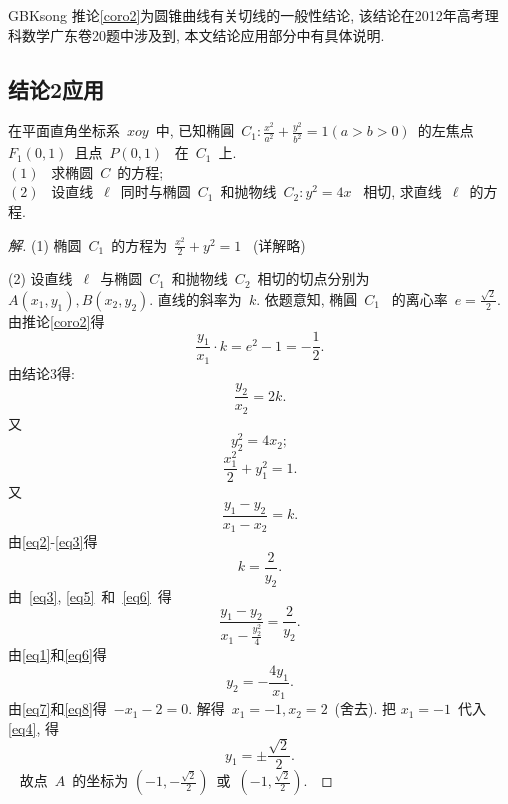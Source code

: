 \documentclass[a4paper, 12pt, twoside]{ctexart}
\begin{document}
\begin{CJK*}{GBK}{song}
    推论\ref{coro2}为圆锥曲线有关切线的一般性结论, 该结论在2012年高考理科数学广东卷20题中涉及到,  本文结论应用部分中有具体说明.
    \bigskip



\subsection{结论2应用}
    \begin{exa}[2012年广东高考文科第20题]
        在平面直角坐标系~$xoy$~中, 已知椭圓~$C_{1}:  \frac{x^2}{a^2}+\frac{y^2}{b^2}=1(a>b>0)$~的左焦点~$F_{1}(0,1)$~且点~$P(0,1)$~ 在~$C_{1}$~上.\\
        \indent $(1)$~ 求椭圆~$C$~的方程;\\
        \indent $(2)$~ 设直线~$\ell$~同时与椭圆~$C_{1}$~和抛物线~$C_{2}:  y^2=4 x$~ 相切, 求直线~$\ell$~的方程.
    \end{exa}

    \begin{proof}[解]
    (1) 椭圆~$C_{1}$~的方程为~$\frac{x^2}{2}+y^2=1$~ (详解略)

     (2) 设直线~$\ell$~与椭圆~$C_{1}$~和抛物线~$C_{2}$~相切的切点分别为 $A(x_1, y_1),  B(x_2,y_2)$. 直线的斜率为~$k$. 依题意知, 椭圓~$C_{1}$~ 的离心率~$e=\frac{\sqrt{2}}{2}$. 由推论\ref{coro2}得
        \begin{equation}\label{eq1}
        \frac{y_{1}}{x_1} \cdot k=e^2-1=-\frac12.
        \end{equation}
    由结论3得:
        \begin{equation}\label{eq2}
            \frac{y_{2}}{x_2}=2 k.
        \end{equation}
    又
        \begin{equation}\label{eq3}
            y_{2}^{2}=4 x_2;
        \end{equation}
        \begin{equation}\label{eq4}
            \frac{x_1^{2}}{2}+y_{1}^{2}=1.
        \end{equation}
    又
        \begin{equation}\label{eq5}
            \frac{y_{1}-y_{2}}{x_1-x_2}=k.
        \end{equation}
    由\eqref{eq2}-\eqref{eq3}得
        \begin{equation}\label{eq6}
            k=\frac{2}{y_{2}}.
        \end{equation}
    由~\eqref{eq3}, \eqref{eq5}~和~\eqref{eq6}~得
        \begin{equation}\label{eq7}
            \frac{y_{1}-y_{2}}{x_1-\frac{y_{2}^{2}}{4}}=\frac{2}{y_{2}}.
        \end{equation}
    由\eqref{eq1}和\eqref{eq6}得
    \begin{equation}\label{eq8}
        y_{2}=-\frac{4 y_{1}}{x_1}.
    \end{equation}
    由\eqref{eq7}和\eqref{eq8}得~$-x_1-2=0$. 解得~$x_1=-1, x_2=2$~(舍去). 把 $x_1=-1$~代入\eqref{eq4}, 得
        $$~y_{1}=\pm\frac{\sqrt{2}}{2}.~$$~
    故点~$A$~的坐标为 $(-1, -\frac{\sqrt{2}}{2})$~或~$(-1, \frac{\sqrt{2}}{2}).$~


\end{proof}
\end{CJK*}
\end{document}

